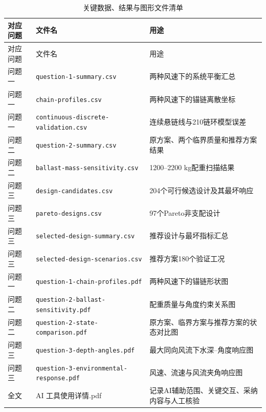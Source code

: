 \documentclass[UTF8,zihao=-4,a4paper,fontset=fandol]{ctexart}
\begin{document}
\begin{longtable}{L{0.12\textwidth}L{0.34\textwidth}L{0.42\textwidth}}
\caption{关键数据、结果与图形文件清单}\label{tab:appendix-data}\\
\toprule 对应问题 & 文件名 & 用途\\ \midrule
\endfirsthead
\toprule 对应问题 & 文件名 & 用途\\ \midrule
\endhead
问题一 & \texttt{question-1-summary.csv} & 两种风速下的系统平衡汇总\\
问题一 & \texttt{chain-profiles.csv} & 两种风速下的锚链离散坐标\\
问题一 & \texttt{continuous-discrete-validation.csv} & 连续悬链线与210链环模型误差\\
问题二 & \texttt{question-2-summary.csv} & 原方案、两个临界质量和推荐方案结果\\
问题二 & \texttt{ballast-mass-sensitivity.csv} & 1200--2200 kg配重扫描结果\\
问题三 & \texttt{design-candidates.csv} & 204个可行候选设计及其最坏响应\\
问题三 & \texttt{pareto-designs.csv} & 97个Pareto非支配设计\\
问题三 & \texttt{selected-design-summary.csv} & 推荐设计与最坏指标汇总\\
问题三 & \texttt{selected-design-scenarios.csv} & 推荐方案180个验证工况\\
问题一 & \texttt{question-1-chain-profiles.pdf} & 两种风速下的锚链形状图\\
问题二 & \texttt{question-2-ballast-sensitivity.pdf} & 配重质量与角度约束关系图\\
问题二 & \texttt{question-2-state-comparison.pdf} & 原方案、临界方案与推荐方案的状态对比图\\
问题三 & \texttt{question-3-depth-angles.pdf} & 最大同向风流下水深--角度响应图\\
问题三 & \texttt{question-3-environmental-response.pdf} & 风速、流速与风流夹角响应图\\
全文 & AI 工具使用详情.pdf & 记录AI辅助范围、关键交互、采纳内容与人工核验\\
\bottomrule
\end{longtable}
\endgroup
\end{document}
